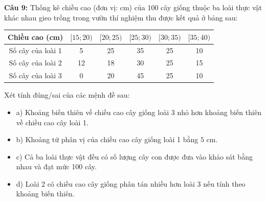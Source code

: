 \documentclass[12pt]{article}
\begin{document}
	\vspace{4mm}
	
	\noindent \textbf{Câu 9:} Thống kê chiều cao (đơn vị: cm) của 100 cây giống thuộc ba loài thực vật khác nhau gieo trồng trong vườn thí nghiệm thu được kết quả ở bảng sau:
	\begin{center}
		\renewcommand{\arraystretch}{1.3}
		\begin{tabular}{|c|c|c|c|c|c|}
			\hline
			Chiều cao (cm) & $[15; 20)$ & $[20; 25)$ & $[25; 30)$ & $[30; 35)$ & $[35; 40)$ \\
			\hline
			Số cây của loài 1 & 5 & 25 & 35 & 25 & 10 \\
			\hline
			Số cây của loài 2 & 12 & 18 & 30 & 25 & 15 \\
			\hline
			Số cây của loài 3 & 0 & 20 & 45 & 25 & 10 \\
			\hline
		\end{tabular}
	\end{center}
	Xét tính đúng/sai của các mệnh đề sau:
	\begin{itemize}[label=, leftmargin=*]
		\item  a) Khoảng biến thiên về chiều cao cây giống loài 3 nhỏ hơn khoảng biến thiên về chiều cao cây loài 1.
		\item  b) Khoảng tứ phân vị của chiều cao cây giống loài 1 bằng $5\text{ cm}$.
		\item  c) Cả ba loài thực vật đều có số lượng cây con được đưa vào khảo sát bằng nhau và đạt mức 100 cây.
		\item  d) Loài 2 có chiều cao cây giống phân tán nhiều hơn loài 3 nếu tính theo khoảng biến thiên.
	\end{itemize}
	
	\vspace{4mm}
	
\end{document}
